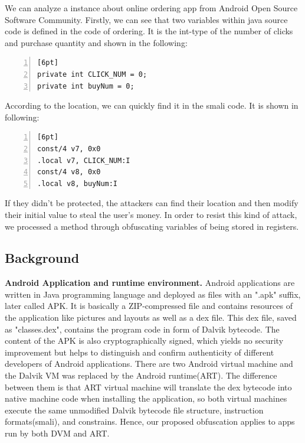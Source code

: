 We can analyze a instance about online ordering app from Android Open Source Software Community. Firstly, we can see that two variables within java source code is defined in the code of ordering. It is the int-type of the number of clicks and purchase quantity and shown in the following:


\begin{lstlisting}[language={[ANSI]C}, backgroundcolor=\color{backcolour},
numbers=left,numberstyle=\tiny,keywordstyle=\color{blue},commentstyle=\color{red!50!green!50!blue!50}][6pt]
private int CLICK_NUM = 0;
private int buyNum = 0;
\end{lstlisting}

\noindent According to the location, we can quickly find it in the smali code. It is shown in following:
 
\begin{lstlisting}[language={[ANSI]C}, backgroundcolor=\color{backcolour},
numbers=left,numberstyle=\tiny,keywordstyle=\color{blue},commentstyle=\color{red!50!green!50!blue!50}][6pt]
const/4 v7, 0x0
.local v7, CLICK_NUM:I
const/4 v8, 0x0
.local v8, buyNum:I
\end{lstlisting}

\noindent  If they didn't be protected, the attackers can find their location and then modify their initial value to steal the user's money. In order to resist this kind of attack, we processed a method through obfuscating variables of being stored in registers.


\subsection{Background}
\textbf{Android Application and runtime environment.} Android applications are written in Java programming language and deployed as files with an ".apk" suffix, later called APK. It is basically a ZIP-compressed file and contains resources of the application like pictures and layouts as well as a dex file. This dex file, saved as "classes.dex", contains the program code in form of Dalvik bytecode. The content of the APK is also cryptographically signed, which yields no security improvement but helps to distinguish and confirm authenticity of different developers of Android applications. There are two Android virtual machine and the Dalvik VM was replaced by the Android runtime(ART). The difference between them is that ART virtual machine will translate the dex bytecode into native machine code when installing the application, so both virtual machines execute the same unmodified Dalvik bytecode file structure, instruction formats(smali), and constrains. Hence, our proposed obfuscation applies to apps run by both DVM and ART.

